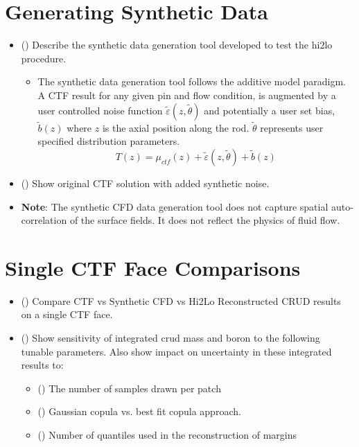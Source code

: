 

\section{Generating Synthetic Data}

\begin{itemize}
    \item (\checkmark) Describe the synthetic data generation tool developed to test the hi2lo procedure.
        \begin{itemize}
            \item The synthetic data generation tool follows the additive model paradigm.  A CTF result for any
                given pin and flow condition, is augmented by a user controlled noise function $\tilde \varepsilon(z, \tilde \theta)$
                and potentially a user set bias, $\tilde b(z)$ where $z$ is the axial position along the rod. 
                $\tilde \theta$ represents user specified distribution parameters.
                \begin{equation}
                    T(z) = \mu_{ctf}(z) + \tilde \varepsilon (z, \tilde \theta) + \tilde b(z)
                \end{equation}
        \end{itemize}
    \item (\checkmark) Show original CTF solution with added synthetic noise.
    \item \textbf{Note}: The synthetic CFD data generation tool does not capture spatial auto-correlation of the surface fields.  It does not reflect
        the physics of fluid flow.
\end{itemize}

\section{Single CTF Face Comparisons}
\begin{itemize}
    \item (\checkmark) Compare CTF vs Synthetic CFD vs Hi2Lo Reconstructed CRUD results on a single CTF face.
    \item (\checkmark) Show sensitivity of integrated crud mass and boron to the following tunable parameters.  Also show impact on uncertainty in these integrated results to:
        \begin{itemize}
            \item (\checkmark) The number of samples drawn per patch
            \item (\checkmark) Gaussian copula vs. best fit copula approach.
            \item (\checkmark) Number of quantiles used in the reconstruction of margins
        \end{itemize}
\end{itemize}

